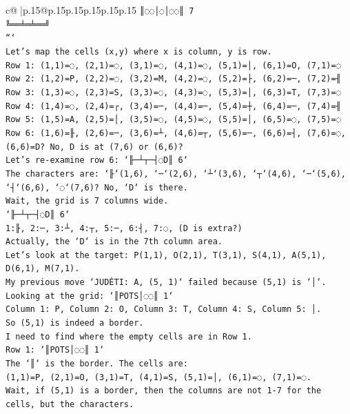 \documentclass{article}
\begin{document}
{\begin{supertabular}{c@{$\;$}|p{.15\linewidth}@{}p{.15\linewidth}p{.15\linewidth}p{.15\linewidth}p{.15\linewidth}p{.15\linewidth}}
{{{\texttt{║◌◌│◌│◌◌║ 7} \\
\texttt{╚══╧═╧══╝} \\
\texttt{```} \\
\texttt{Let's map the cells (x,y) where x is column, y is row.} \\
\texttt{Row 1: (1,1)=◌, (2,1)=◌, (3,1)=◌, (4,1)=◌, (5,1)=│, (6,1)=O, (7,1)=◌} \\
\texttt{Row 2: (1,2)=P, (2,2)=◌, (3,2)=M, (4,2)=◌, (5,2)=├, (6,2)=─, (7,2)=╢} \\
\texttt{Row 3: (1,3)=◌, (2,3)=S, (3,3)=◌, (4,3)=◌, (5,3)=│, (6,3)=T, (7,3)=◌} \\
\texttt{Row 4: (1,4)=◌, (2,4)=┌, (3,4)=─, (4,4)=─, (5,4)=┼, (6,4)=─, (7,4)=╢} \\
\texttt{Row 5: (1,5)=A, (2,5)=│, (3,5)=◌, (4,5)=◌, (5,5)=│, (6,5)=◌, (7,5)=◌} \\
\texttt{Row 6: (1,6)=╟, (2,6)=─, (3,6)=┴, (4,6)=┬, (5,6)=─, (6,6)=┤, (7,6)=◌, (6,6)=D? No, D is at (7,6) or (6,6)?} \\
\texttt{Let's re{-}examine row 6: `╟─┴┬─┤◌D║ 6`} \\
\texttt{The characters are: `╟`(1,6), `─`(2,6), `┴`(3,6), `┬`(4,6), `─`(5,6), `┤`(6,6), `◌`(7,6)? No, `D` is there.} \\
\texttt{Wait, the grid is 7 columns wide.} \\
\texttt{`╟─┴┬─┤◌D║ 6`} \\
\texttt{1:╟, 2:─, 3:┴, 4:┬, 5:─, 6:┤, 7:◌, (D is extra?)} \\
\texttt{Actually, the `D` is in the 7th column area.} \\
\texttt{Let's look at the target: P(1,1), O(2,1), T(3,1), S(4,1), A(5,1), D(6,1), M(7,1).} \\
\texttt{My previous move `JUDĖTI: A, (5, 1)` failed because (5,1) is `│`.} \\
\texttt{Looking at the grid: `║POTS│◌◌║ 1`} \\
\texttt{Column 1: P, Column 2: O, Column 3: T, Column 4: S, Column 5: │.} \\
\texttt{So (5,1) is indeed a border.} \\
\texttt{I need to find where the empty cells are in Row 1.} \\
\texttt{Row 1: `║POTS│◌◌║ 1`} \\
\texttt{The `║` is the border. The cells are:} \\
\texttt{(1,1)=P, (2,1)=O, (3,1)=T, (4,1)=S, (5,1)=│, (6,1)=◌, (7,1)=◌.} \\
\texttt{Wait, if (5,1) is a border, then the columns are not 1{-}7 for the cells, but the characters.} \\
}}}
\end{supertabular}}
\end{document}
